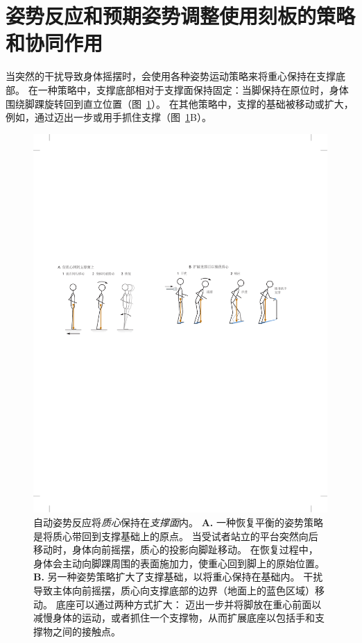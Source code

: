 \section{姿势反应和预期姿势调整使用刻板的策略和协同作用}

当突然的干扰导致身体摇摆时，会使用各种姿势运动策略来将重心保持在支撑底部。
在一种策略中，支撑底部相对于支撑面保持固定：当脚保持在原位时，身体围绕脚踝旋转回到直立位置（图~\ref{fig:36_2}）。
在其他策略中，支撑的基础被移动或扩大，例如，通过迈出一步或用手抓住支撑（图~\ref{fig:36_2}B）。


\begin{figure}[htbp]
	\centering
	\includegraphics[width=1.0\linewidth]{chap36/fig_36_2}
	\caption{自动姿势反应将\textit{质心}保持在\textit{支撑面}内。
		\textbf{A.} 一种恢复平衡的姿势策略是将质心带回到支撑基础上的原点。
		当受试者站立的平台突然向后移动时，身体向前摇摆，质心的投影向脚趾移动。
		在恢复过程中，身体会主动向脚踝周围的表面施加力，使重心回到脚上的原始位置。
		\textbf{B.} 另一种姿势策略扩大了支撑基础，以将重心保持在基础内。
		干扰导致主体向前摇摆，质心向支撑底部的边界（地面上的蓝色区域）移动。
		底座可以通过两种方式扩大：
		迈出一步并将脚放在重心前面以减慢身体的运动，或者抓住一个支撑物，从而扩展底座以包括手和支撑物之间的接触点。}
	\label{fig:36_2}
\end{figure}


